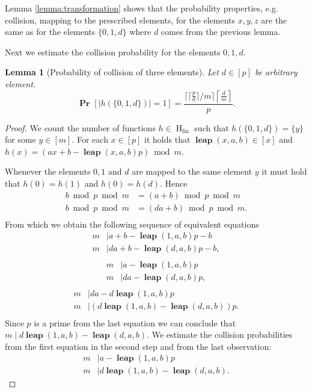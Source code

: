 \documentclass{article}
\newcommand{\hlin}{\operatorname{H}_{\operatorname{lin}}}
\newcommand{\leap}[3]{\operatorname{\mathbf{leap}}({#1}, {#2}, {#3})}
\newcommand{\probs}[2]{\operatorname{\mathbf{Pr}}_{{#1}}\left[{#2}\right]}
\newcommand{\prob}[1]{\probs{}{#1}}
\newtheorem{lemma}{Lemma}
\begin{document}
Lemma \ref{lemma:transformation} shows that the probability properties, e.g. collision, mapping to the prescribed elements, for the elements $x, y, z$ are the same as for the elements $\{0, 1, d\}$ where $d$ comes from the previous lemma.

Next we estimate the collision probability for the elements $0, 1, d$.

\begin{lemma}[Probability of collision of three elements]
\label{lemma:probability-3-elements}
Let $d \in [p]$ be arbitrary element.
\[
\prob{|h(\{0, 1, d\})| = 1 } = \frac{\lceil \lceil\frac{p}{d}\rceil / m \rceil\left\lceil\frac{d}{m}\right\rceil}{p}.
\]
\end{lemma}
\begin{proof}
We count the number of functions $h \in \hlin$ such that $h(\{0, 1, d\}) = \{y\}$ for some $y \in [m]$.
For each $x \in [p]$ it holds that $\leap{x}{a}{b} \in [x]$ and $h(x) = (ax + b - \leap{x}{a}{b}p) \bmod m$.

Whenever the elements $0, 1$ and $d$ are mapped to the same element $y$ it must hold that $h(0) = h(1)$ and $h(0) = h(d)$. Hence
\begin{align*}
	b \bmod p \bmod m & = (a + b) \bmod p \bmod m \\
	b \bmod p \bmod m & = (da + b) \bmod p \bmod m. \\
\end{align*}
From which we obtain the following sequence of equivalent equations
\begin{align*}
	m & \mid a + b - \leap{1}{a}{b}p - b \\
	m & \mid da + b - \leap{d}{a}{b}p - b, \\
\end{align*}
\begin{align*}
	m & \mid a - \leap{1}{a}{b}p \\
	m & \mid da - \leap{d}{a}{b}p, \\
\end{align*}
\begin{align*}
	m & \mid da - d\leap{1}{a}{b}p \\
	m & \mid (d\leap{1}{a}{b} - \leap{d}{a}{b})p. \\
\end{align*}
Since $p$ is a prime from the last equation we can conclude that $m \mid d\leap{1}{a}{b} - \leap{d}{a}{b}$.
We estimate the collision probabilities from the first equation in the second step and from the last observation:
\begin{align}
	m & \mid a - \leap{1}{a}{b}p \label{3-prob-1-statement} \\
	m & \mid d\leap{1}{a}{b} - \leap{d}{a}{b}. \label{3-prob-2-statement}
\end{align}


\end{proof}
\end{document}
